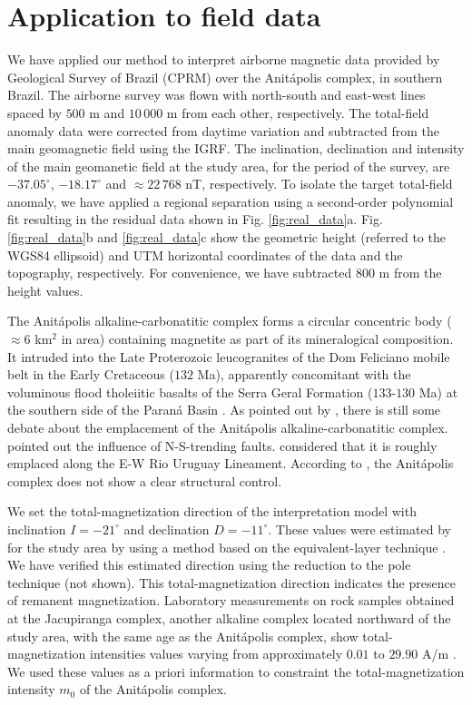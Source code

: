 \section{Application to field data}

We have applied our method to interpret airborne magnetic data provided by 
Geological Survey of Brazil (CPRM) over the Anit{\'a}polis complex, 
in southern Brazil. 
The airborne survey was flown with north-south and east-west lines spaced by $500$ m and $10\,000$ m from each other, respectively. 
The total-field anomaly data were corrected from daytime variation and 
subtracted from the main geomagnetic field using the IGRF. 
The inclination, declination and intensity of the main geomanetic field at the study area, 
for the period of the survey, are $-37.05^{\circ}$, $-18.17^{\circ}$ and 
$\approx 22 \, 768 $ nT, respectively.
To isolate the target total-field anomaly, we have applied 
a regional separation using a second-order polynomial fit resulting in the residual data 
shown in Fig. \ref{fig:real_data}a. 
Fig. \ref{fig:real_data}b and \ref{fig:real_data}c show the geometric height
(referred to the WGS84 ellipsoid) and UTM horizontal coordinates of the data and the 
topography, respectively. For convenience, we have subtracted $ 800 $ m from the height 
values.

The Anit{\'a}polis alkaline-carbonatitic complex forms a circular concentric body 
($\approx 6$ km$^{2}$ in area) containing magnetite as part of its mineralogical 
composition. It intruded into the Late Proterozoic leucogranites of the Dom Feliciano 
mobile belt in the Early Cretaceous ($132$ Ma), apparently concomitant with the 
voluminous flood tholeiitic basalts of the Serra Geral Formation ($133$-$130$ Ma) 
at the southern side of the Paran{\'a} Basin \citep{gibson-1999, scheibe-etal2005}.
As pointed out by \citet{GOMES2018}, there is still some debate about the emplacement 
of the Anit{\'a}polis alkaline-carbonatitic complex. 
\citet{melcher-coutinho1966} pointed out the influence of N-S-trending faults. 
\citet{scheibe-etal2005} considered that it is roughly emplaced along the E-W Rio 
Uruguay Lineament. According to \citet{riccomini-etal2005}, the Anit{\'a}polis 
complex does not show a clear structural control. 

We set the total-magnetization direction of the interpretation model with
inclination $ I=-21^\circ $ and declination $ D=-11^\circ $. These values were estimated 
by \cite{reis-seg-2019} for the study area by using a method based on the 
equivalent-layer technique \cite[]{dampney1969,emilia1973}. We have verified this estimated 
direction using the reduction to the pole technique (not shown). 
This total-magnetization direction indicates the presence of remanent magnetization.
Laboratory measurements on rock samples obtained at the Jacupiranga complex,
another alkaline complex located northward of the study area, 
with the same age as the Anit{\'a}polis complex, 
show total-magnetization intensities values varying from approximately 
$0.01$ to $29.90$ A/m \citep[][ tb. 1]{valdivia-2009}.
We used these values as a priori information to constraint the 
total-magnetization intensity $m_{0}$ of the Anit{\'a}polis complex.

